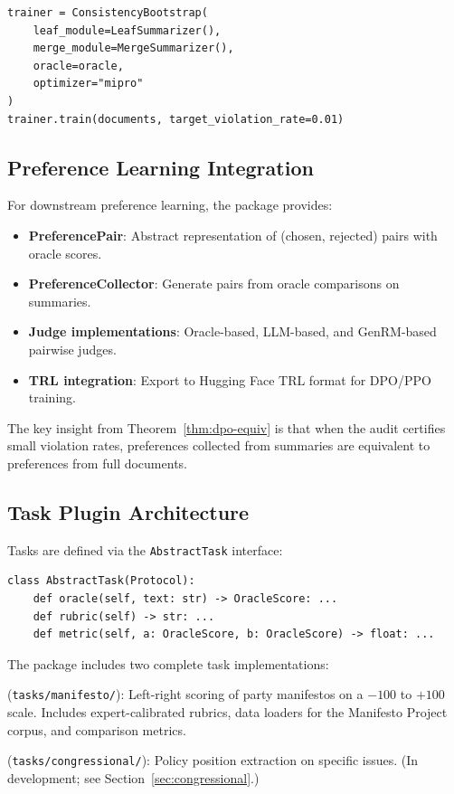 \begin{lstlisting}
trainer = ConsistencyBootstrap(
    leaf_module=LeafSummarizer(),
    merge_module=MergeSummarizer(),
    oracle=oracle,
    optimizer="mipro"
)
trainer.train(documents, target_violation_rate=0.01)
\end{lstlisting}

\subsection{Preference Learning Integration}

For downstream preference learning, the package provides:

\begin{itemize}[nosep]
    \item \textbf{PreferencePair}: Abstract representation of (chosen, rejected) pairs with oracle scores.
    \item \textbf{PreferenceCollector}: Generate pairs from oracle comparisons on summaries.
    \item \textbf{Judge implementations}: Oracle-based, LLM-based, and GenRM-based pairwise judges.
    \item \textbf{TRL integration}: Export to Hugging Face TRL format for DPO/PPO training.
\end{itemize}

The key insight from Theorem~\ref{thm:dpo-equiv} is that when the audit certifies small violation rates, preferences collected from summaries are equivalent to preferences from full documents.

\subsection{Task Plugin Architecture}

Tasks are defined via the \texttt{AbstractTask} interface:

\begin{lstlisting}
class AbstractTask(Protocol):
    def oracle(self, text: str) -> OracleScore: ...
    def rubric(self) -> str: ...
    def metric(self, a: OracleScore, b: OracleScore) -> float: ...
\end{lstlisting}

The package includes two complete task implementations:

\begin{description}[nosep]
    \item[Manifesto RILE] (\texttt{tasks/manifesto/}): Left-right scoring of party manifestos on a $-100$ to $+100$ scale. Includes expert-calibrated rubrics, data loaders for the Manifesto Project corpus, and comparison metrics.
    \item[Congressional Record] (\texttt{tasks/congressional/}): Policy position extraction on specific issues. (In development; see Section~\ref{sec:congressional}.)
\end{description}

